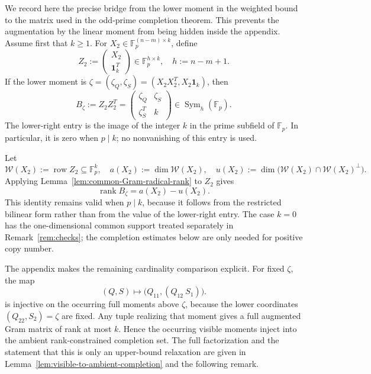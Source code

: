 \documentclass[11pt]{article}
\newcommand{\F}{\mathbb F}
\newcommand{\Sym}{\operatorname{Sym}}
\newcommand{\rank}{\operatorname{rank}}
\newcommand{\1}{\mathbf 1}
\theoremstyle{plain}
\theoremstyle{definition}
\theoremstyle{remark}
\begin{document}
We record here the precise bridge from the lower moment in the weighted bound
to the matrix used in the odd-prime completion theorem.  This prevents the
augmentation by the linear moment from being hidden inside the appendix.
Assume first that $k\ge1$.  For
$X_2\in\F_p^{(n-m)\times k}$, define
\begin{equation}
 Z_2:=\begin{pmatrix}X_2\\ \1_k^T\end{pmatrix}
 \in\F_p^{h\times k},
 \quad h:=n-m+1.
 \label{eq:main-odd-augmented-lower-matrix}
\end{equation}
If the lower moment is
$\zeta=(\zeta_Q,\zeta_S)=(X_2X_2^T,X_2\1_k)$, then
\begin{equation}
 B_\zeta:=Z_2Z_2^T
 =\begin{pmatrix}
   \zeta_Q&\zeta_S\\
   \zeta_S^T&k
  \end{pmatrix}\in\Sym_h(\F_p).
 \label{eq:main-odd-augmented-Gram-matrix}
\end{equation}
The lower-right entry is the image of the integer $k$ in the prime subfield
of $\F_p$.  In particular, it is zero when $p\mid k$; no nonvanishing of this
entry is used.

Let
\begin{equation}
 \mathcal W(X_2):=\operatorname{row}Z_2\subseteq\F_p^k,
 \quad a(X_2):=\dim\mathcal W(X_2),
 \quad u(X_2):=\dim\bigl(\mathcal W(X_2)\cap\mathcal W(X_2)^\perp\bigr).
 \label{eq:main-odd-augmented-row-space-pair}
\end{equation}
Applying Lemma~\ref{lem:common-Gram-radical-rank} to $Z_2$ gives
\begin{equation}
 \rank B_\zeta=a(X_2)-u(X_2).
 \label{eq:main-odd-augmented-Gram-rank}
\end{equation}
This identity remains valid when $p\mid k$, because it follows from the
restricted bilinear form rather than from the value of the lower-right
entry.  The case
$k=0$ has the one-dimensional common support treated separately in
Remark~\ref{rem:checks}; the completion estimates below are only needed for
positive copy number.

The appendix makes the remaining cardinality comparison explicit.  For fixed
$\zeta$, the map
\begin{equation}
 (Q,S)\longmapsto\bigl(Q_{11},(Q_{12}\ S_1)\bigr).
 \label{eq:main-visible-to-ambient-map-preview}
\end{equation}
is injective on the occurring full moments above $\zeta$, because the lower
coordinates $(Q_{22},S_2)=\zeta$ are fixed.  Any tuple realizing that moment
gives a full augmented Gram matrix of rank at most $k$.  Hence the occurring
visible moments inject into the ambient rank-constrained completion set.  The
full factorization and the statement that this is only an upper-bound
relaxation are given in Lemma~\ref{lem:visible-to-ambient-completion} and the
following remark.
\end{document}
